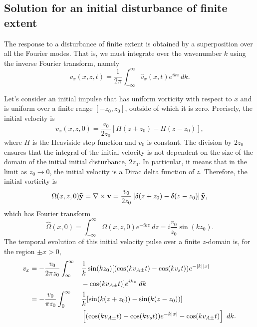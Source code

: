 \subsection{Solution for an initial disturbance of finite extent}

The response to a disturbance of finite extent is obtained by a superposition over all the Fourier modes. That is, we must integrate over the wavenumber $k$ using the inverse Fourier transform, namely
\begin{equation}
v_x(x, z, t) = \frac{1}{2\pi}\int_{-\infty}^{\infty} \widehat{v}_x(x, t) e^{ikz} ~dk.
\end{equation}

Let's consider an initial impulse that has uniform vorticity with respect to $x$ and is uniform over a finite range $[-z_0, z_0]$, outside of which it is zero. Precisely, the initial velocity is
\begin{equation}
v_x(x, z, 0) = \frac{v_0}{2z_0}\left[H(z + z_0) - H(z - z_0)\right],
\end{equation}
where $H$ is the Heaviside step function and $v_0$ is constant. The division by $2z_0$ ensures that the integral of the initial velocity is not dependent on the size of the domain of the initial initial disturbance, $2z_0$. In particular, it means that in the limit as $z_0 \to 0$, the initial velocity is a Dirac delta function of $z$. Therefore, the initial vorticity is
\begin{equation}
\Omega(x, z, 0) \mathbf{\widehat{y}} = \nabla \times \mathbf{v} = \frac{v_0}{2z_0}\left[\delta(z + z_0) - \delta(z - z_0)\right] \mathbf{\widehat{y}},
\end{equation}
which has Fourier transform
\begin{equation}
\widehat{\Omega}(x, 0) = \int_{-\infty}^{\infty} \Omega(x, z, 0) e^{-ikz} ~dz = i\frac{v_0}{z_0}\sin(kz_0).
\end{equation}
The temporal evolution of this initial velocity pulse over a finite $z$-domain is, for the region $\pm x > 0$,
\begin{alignat}{3}
v_x &= -\frac{v_0}{2\pi z_0} \int_{\infty}^{\infty} && \frac{1}{k}\sin(kz_0) [(\cos(kv_{A\pm}t) - \cos(kv_st))e^{-|k||x|} \notag \\ & &&- \cos(kv_{A\pm}t)] e^{ikz} ~dk \notag \\
& = -\frac{v_0}{\pi z_0} \int_{0}^{\infty} && \frac{1}{k} [\sin(k(z + z_0)) - \sin(k(z - z_0))] \notag \\ & && \left[(\cos(kv_{A\pm}t) - \cos(kv_st))e^{-k|x|} - \cos(kv_{A\pm}t)\right] ~dk. \label{vx intermediate}
\end{alignat}
